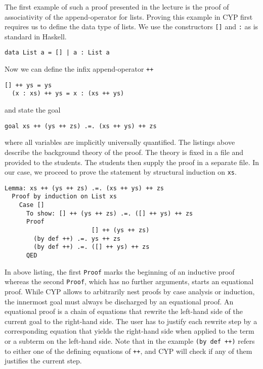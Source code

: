 The first example of such a proof presented in the lecture is the proof of associativity of the append-operator for lists.
Proving this example in CYP first requires us
to define the data type of lists.
We use
the constructors \lstinline[style=cyp]![]! and \lstinline[style=cyp]!:!
as is standard in Haskell.
\begin{lstlisting}[style=cyp]
  data List a = [] | a : List a
\end{lstlisting}
Now we can define the infix append-operator \lstinline[style=cyp]!++!
\begin{lstlisting}[style=cyp]
  [] ++ ys = ys
  (x : xs) ++ ys = x : (xs ++ ys)
\end{lstlisting}
and state the goal
\begin{lstlisting}[style=cyp]
  goal xs ++ (ys ++ zs) .=. (xs ++ ys) ++ zs
\end{lstlisting}
where all variables are implicitly universally quantified.
The listings above describe the background theory of the proof.
The theory is fixed in a file and provided
to the students.
The students then supply the proof in a separate file.
In our case, we proceed to prove the statement by structural induction on \lstinline[style=cyp]!xs!.
\begin{lstlisting}[style=cyp]
  Lemma: xs ++ (ys ++ zs) .=. (xs ++ ys) ++ zs
  Proof by induction on List xs
    Case []
      To show: [] ++ (ys ++ zs) .=. ([] ++ ys) ++ zs
      Proof
                        [] ++ (ys ++ zs)
        (by def ++) .=. ys ++ zs
        (by def ++) .=. ([] ++ ys) ++ zs
      QED
\end{lstlisting}
In above listing, the first \lstinline[style=cyp]!Proof! marks the beginning of an inductive proof whereas the second \lstinline[style=cyp]!Proof!, which has no further arguments, starts an equational proof.
While CYP allows to arbitrarily nest proofs
by case analysis or induction,
the innermost goal must always be discharged by an equational proof.
An equational proof is a chain of equations that rewrite the left-hand side of the current goal to the right-hand side.
The user has to justify each rewrite step by a corresponding equation that yields the right-hand side
when applied to the term or a subterm on the left-hand side.
Note that in the example \lstinline[style=cyp]!(by def ++)! refers to either one of the defining equations of \lstinline[style=cyp]!++!,
and CYP will check if any of them justifies the current step.

